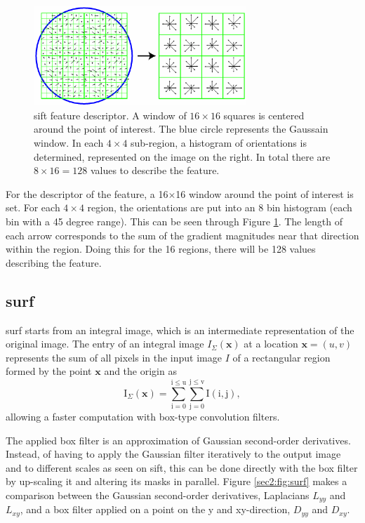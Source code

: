 \begin{figure}
	\centering
	\includegraphics[width=8cm]{images/sift3.png}
	\caption[\acrshort{sift} feature descriptor]{\acrshort{sift} feature descriptor. A window of $16\times16$ squares is centered around the point of interest. The blue circle represents the Gaussain window. In each $4\times4$ sub-region, a histogram of orientations is determined, represented on the image on the right. In total there are $8\times 16 = 128$ values to describe the feature. \cite{sift}}
	\label{sec2:fig:sift3}
\end{figure}
For the descriptor of the feature, a 16$\times$16 window around the point of interest is set. For each $4\times4$ region, the orientations are put into an 8 bin histogram (each bin with a 45 degree range). This can be seen through Figure \ref{sec2:fig:sift3}. The length of each arrow corresponds to the sum of the gradient magnitudes near that direction within the region. Doing this for the 16 regions, there will be 128 values describing the feature.
\cite{sift}

\subsection{\acrlong{surf}}
\label{appendix:cha1:sec1:surf}
\acrshort{surf} starts from an integral image, which is an intermediate representation of the
original image. The entry of an integral image $I_{\Sigma}( \mathbf{x})$ at a location
$\mathbf{x} = (u, v)$ represents the sum of all pixels in the input image $I$ of a rectangular region formed by the point $\mathbf{x}$ and the origin as 
\begin{equation}
\label{sec2:eq:int}
\mathrm { I } _ { \Sigma } ( \mathbf{x} ) = \sum _ { \mathrm { i } = 0 } ^ { \mathrm { i } \leq \mathrm { u } } \sum _ { \mathrm { j } = 0 } ^ { \mathrm { j } \leq \mathrm { v } } \mathrm { I } ( \mathrm { i } , \mathrm { j } ),
\end{equation}
allowing a faster computation with box-type convolution filters. 

The applied box filter is an approximation of Gaussian second-order derivatives. Instead, of having to apply the Gaussian filter iteratively to the output image and to different scales as seen on \acrshort{sift}, this can be done directly with the box filter by up-scaling it and altering its masks in parallel. Figure \ref{sec2:fig:surf} makes a comparison between the Gaussian second-order derivatives, Laplacians $L_{yy}$ and $L_{xy}$, and a box filter applied on a point on the y and xy-direction, $D_{yy}$ and $D_{xy}$.

